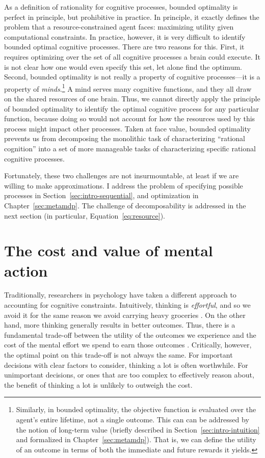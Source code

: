 As a definition of rationality for cognitive processes, bounded optimality is perfect in principle, but prohibitive in practice. In principle, it exactly defines the problem that a resource-constrained agent faces: maximizing utility given computational constraints. In practice, however, it is very difficult to identify bounded optimal cognitive processes. There are two reasons for this. First, it requires optimizing over the set of all cognitive processes a brain could execute. It is not clear how one would even specify this set, let alone find the optimum. Second, bounded optimality is not really a property of cognitive processes---it is a property of \emph{minds}.\footnote{%
  Similarly, in bounded optimality, the objective function is evaluated over the agent's entire lifetime, not a single outcome. This can can be addressed by the notion of long-term value (briefly described in Section~\ref{sec:intro-intuition} and formalized in Chapter~\ref{sec:metamdp}). That is, we can define the utility of an outcome in terms of both the immediate and future rewards it yields.
} A mind serves many cognitive functions, and they all draw on the shared resources of one brain. Thus, we cannot directly apply the principle of bounded optimality to identify the optimal cognitive process for any particular function, because doing so would not account for how the resources used by this process might impact other processes. Taken at face value, bounded optimality prevents us from decomposing the monolithic task of characterizing ``rational cognition'' into a set of more manageable tasks of characterizing specific rational cognitive processes.

Fortunately, these two challenges are not insurmountable, at least if we are willing to make approximations. I address the problem of specifying possible processes in Section~\ref{sec:intro-sequential}, and optimization in Chapter~\ref{sec:metamdp}. The challenge of decomposability is addressed in the next section (in particular, Equation~\ref{eq:resource}).

\section{The cost and value of mental action}\label{sec:intro-cost}

Traditionally, researchers in psychology have taken a different approach to accounting for cognitive constraints. Intuitively, thinking is \emph{effortful}, and so we avoid it for the same reason we avoid carrying heavy groceries \citep{shenhav2017rational}. On the other hand, more thinking generally results in better outcomes. Thus, there is a fundamental trade-off between the utility of the outcomes we experience and the cost of the mental effort we spend to earn those outcomes \citep{kool2018mental}. Critically, however, the optimal point on this trade-off is not always the same. For important decisions with clear factors to consider, thinking a lot is often worthwhile. For unimportant decisions, or ones that are too complex to effectively reason about, the benefit of thinking a lot is unlikely to outweigh the cost.



